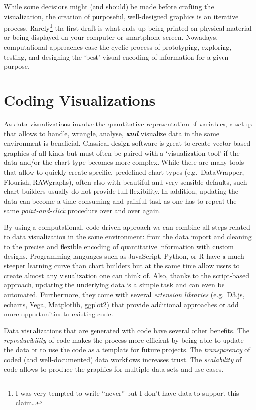 \documentclass[
]{krantz}
\begin{document}
While some decisions might (and should) be made before crafting the visualization, the creation of purposeful, well-designed graphics is an iterative process. Rarely\footnote{I was very tempted to write ``never'' but I don't have data to support this claim\ldots{}} the first draft is what ends up being printed on physical material or being displayed on your computer or smartphone screen. Nowadays, computational approaches ease the cyclic process of prototyping, exploring, testing, and designing the `best' visual encoding of information for a given purpose.

\hypertarget{coding}{%
\section{Coding Visualizations}\label{coding}}

As data visualizations involve the quantitative representation of variables, a setup that allows to handle, wrangle, analyse, \textbf{\emph{and}} visualize data in the same environment is beneficial. Classical design software is great to create vector-based graphics of all kinds but must often be paired with a `visualization tool' if the data and/or the chart type becomes more complex. While there are many tools that allow to quickly create specific, predefined chart types (e.g.~DataWrapper, Flourish, RAWgraphs), often also with beautiful and very sensible defaults, such chart builders usually do not provide full flexibility. In addition, updating the data can become a time-consuming and painful task as one has to repeat the same \emph{point-and-click} procedure over and over again.

By using a computational, code-driven approach we can combine all steps related to data visualization in the same environment: from the data import and cleaning to the precise and flexible encoding of quantitative information with custom designs. Programming languages such as JavaScript, Python, or R have a much steeper learning curve than chart builders but at the same time allow users to create almost any visualization one can think of. Also, thanks to the script-based approach, updating the underlying data is a simple task and can even be automated. Furthermore, they come with several \emph{extension libraries} (e.g.~D3.js, echarts, Vega, Matplotlib, ggplot2) that provide additional approaches or add more opportunities to existing code.

Data visualizations that are generated with code have several other benefits. The \emph{reproducibility} of code makes the process more efficient by being able to update the data or to use the code as a template for future projects. The \emph{transparency} of coded (and well-documented) data workflows increases trust. The \emph{scalability} of code allows to produce the graphics for multiple data sets and use cases.
\end{document}

